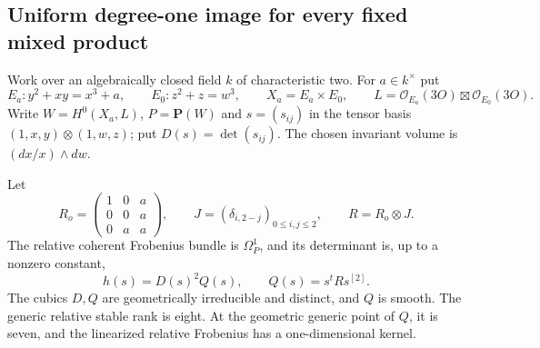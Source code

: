 \subsection{Uniform degree-one image for every fixed mixed product}
\label{subsec:mixed-uniform-degree-one-inertia-candidate}

Work over an algebraically closed field $k$ of characteristic two. For
$a\in k^\times$ put
\[
 E_a:y^2+xy=x^3+a,\qquad E_0:z^2+z=w^3,
 \qquad X_a=E_a\times E_0,
 \qquad L=\mathcal O_{E_a}(3O)\boxtimes\mathcal O_{E_0}(3O).
\]
Write $W=H^0(X_a,L)$, $P=\mathbf P(W)$ and $s=(s_{ij})$ in
the tensor basis $(1,x,y)\otimes(1,w,z)$; put $D(s)=\det(s_{ij})$.
The chosen invariant volume is $(dx/x)\wedge dw$.

\begin{proposition}
\label{prop:mixed-uniform-degree-one-Hasse-candidate}
Let
\[
 R_o=\begin{pmatrix}1&0&a\\0&0&a\\0&a&a\end{pmatrix},
 \qquad J=(\delta_{i,2-j})_{0\le i,j\le2},
 \qquad R=R_o\otimes J.
\]
The relative coherent Frobenius bundle is $\Omega_P^1$, and its
determinant is, up to a nonzero constant,
\[
                   h(s)=D(s)^2Q(s),\qquad Q(s)=s^tRs^{[2]}.
\]
The cubics $D,Q$ are geometrically irreducible and distinct, and
$Q$ is smooth. The generic relative stable rank is eight. At the
geometric generic point of $Q$, it is seven, and the linearized
relative Frobenius has a one-dimensional kernel.
\end{proposition}

